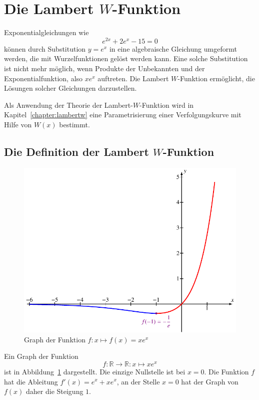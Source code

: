 %
%
%
\section{Die Lambert $W$-Funktion
\label{buch:section:lambertw}}
Exponentialgleichungen wie
\[
e^{2x}+2e^x-15=0
\]
können durch Substitution $y=e^x$ in eine algebraische Gleichung
umgeformt werden, die mit Wurzelfunktionen gelöst werden kann.
Eine solche Substitution ist nicht mehr möglich, wenn Produkte
der Unbekannten und der Exponentialfunktion, also $xe^x$ auftreten.
Die Lambert $W$-Funktion ermöglicht, die Lösungen solcher Gleichungen
darzustellen.

Als Anwendung der Theorie der Lambert-$W$-Funktion wird in
Kapitel~\ref{chapter:lambertw}
eine Parametrisierung einer Verfolgungskurve mit Hilfe von $W(x)$
bestimmt.

%
%
\subsection{Die Definition der Lambert $W$-Funktion
\label{buch:subsection:funktion-xexpx}}
\begin{figure}
\centering
\includegraphics{chapters/020-exponential/images/xexpx.pdf}
\caption{Graph der Funktion $f\colon x\mapsto f(x)=xe^x$
\label{buch:lambert:graph}}
\end{figure}
Ein Graph der Funktion 
\[
f\colon \mathbb{R}\to\mathbb{R} : x\mapsto xe^x
\]
ist in Abbildung~\ref{buch:lambert:graph} dargestellt.
Die einzige Nullstelle ist bei $x=0$.
Die Funktion $f$ hat die Ableitung
$f'(x)=e^x + xe^x$,
an  der Stelle $x=0$ hat der Graph von $f(x)$ daher die Steigung $1$.

